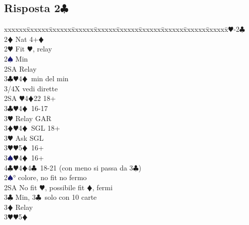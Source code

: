 \documentclass[a4paper,italian]{article}
\newcommand{\BC}{\textcolor{OliveGreen}{$\clubsuit$}}
\newcommand{\BD}{\textcolor{RedOrange}{$\vardiamondsuit$}}
\newcommand{\BH}{\textcolor{Red2}{$\varheartsuit${}}}
\newcommand{\BS}{\textcolor{MidnightBlue}{$\spadesuit${}}}
\newcommand{\pdfc}{\texorpdfstring{\BC{}}{C}}
\newenvironment{bidtable}
{\begin{tabbing}

    xxxxxx\=xxxxxx\=xxxxxx\=xxxxxx\=xxxxxx\=xxxxxx\=xxxxxx\=xxxxxx\=xxxxxx\=xxxxxx\=\kill}
{\end{tabbing} }%
\begin{document}
                                    \subsection{Risposta 2\pdfc}
                                    \begin{multicols}{2}
                                        \begin{bidtable}
                                            1\BH-2\BC\\
                                            2\BD \> Nat 4+\BD \+\\
                                            2\BH \> Fit \BH , relay\+\\
                                            2\BS \> Min\+\\
                                            2SA \> Relay\+\\
                                            3\BC {}\BH 4\BD\ min del min\\
                                            3/4X \> vedi dirette\-\-\\
                                            2SA \BH 4\BD 22 18+\\
                                            3\BC {}\BH 4\BD\ 16-17\+\\
                                            3\BH \> Relay GAR\-\\
                                            3\BD {}\BH 4\BD\ SGL 18+\+\\
                                            3\BH \> Ask SGL\-\\
                                            3\BH {}\BH 5\BD\ 16+\\
                                            3\BS {}\BH 4\BD\ 16+\\
                                            4\BC {}\BH 4\BD 4\BC\ 18-21 (con meno si passa da 3\BC )\-\\
                                            2\BS {}° colore, no fit no fermo\\
                                            2SA \> No fit \BH , possibile fit \BD , fermi\+\\
                                            3\BC \> Min, 3\BC\ solo con 10 carte\+\\
                                            3\BD \> Relay\+\\
                                            3\BH {}\BH 5\BD \\

\end{bidtable}
\end{multicols}
\end{document}
